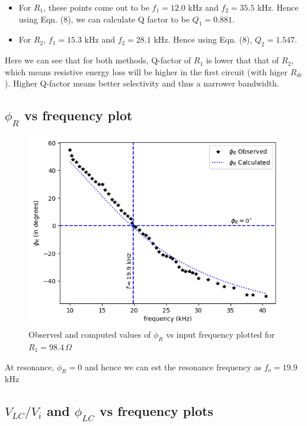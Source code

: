        \begin{itemize}
            \item For $R_1$, these points come out to be $f_1 = 12.0$ kHz and $f_2 = 35.5$ kHz. Hence using Eqn. (8), we can calculate Q factor to be $Q_1=0.881$.
            \item For $R_2$, $f_1 = 15.3$ kHz and $f_2 = 28.1$ kHz. Hence using Eqn. (8), $Q_2=1.547$.
        \end{itemize}

        Here we can see that for both methods, Q-factor of $R_1$ is lower that that of $R_2$, which means resistive energy loss will be higher in the first circuit (with higer $R_{dc}$). Higher Q-factor means better selectivity and thus a narrower bandwidth.

    \subsection{$\phi_R$ vs frequency plot}

        \begin{figure}[H]
            \centering
            \includegraphics[width=1\columnwidth]{images/g1.png}
            \caption{Observed and computed values of $\phi_R$ vs input frequency plotted for $R_1=98.4\,\Omega$}
            \label{graph:2}
        \end{figure}

        At resonance, $\phi_R=0$ and hence we can est the resonance frequency as $f_o=19.9$ kHz

    \subsection{$V_{LC}/V_i$ and $\phi_{LC}$ vs frequency plots}

